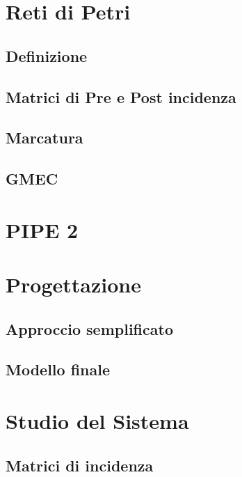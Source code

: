\chapter{Reti di Petri}
\label{cap:cap1}
\lhead{\textbf{\rightmark}}

\newpage

\section{Definizione}
\label{sec:1.1}

\newpage

\section{Matrici di Pre e Post incidenza}
\label{sec:1.2}

\newpage

\section{Marcatura}
\label{sec:1.3}

\newpage

\section{GMEC}
\label{sec:1.4}

\newpage


\chapter{PIPE 2}
\label{cap:cap2}
\lhead{\textbf{\rightmark}}

\newpage


\chapter{Progettazione}
\label{cap:cap3}
\lhead{\textbf{\rightmark}}

\newpage

\section{Approccio semplificato}
\label{sec:3.1}

\newpage

\section{Modello finale}
\label{sec:3.2}

\newpage


\chapter{Studio del Sistema}
\label{cap:cap4}
\lhead{\textbf{\rightmark}}

\newpage

\section{Matrici di incidenza}
\label{sec:4.1}

\newpage